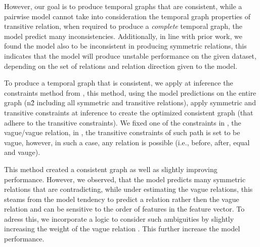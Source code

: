 





However, our goal is to produce temporal graphs that are consistent, while a pairwise model cannot take into consideration the temporal graph properties of transitive relation, when required to produce a \textit{complete} temporal graph, the model predict many inconsistencies. Additionally, in line with prior work, we found the model also to be inconsistent in producing symmetric relations, this indicates that the model will produce unstable performance on the given dataset, depending on the set of relations and relation direction given to the model. 

To produce a temporal graph that is consistent, we apply at inference the constraints method from \citep{ning-etal-2018-joint}, this method, using the model predictions on the entire graph (n\^2 including all symmetric and transitive relations), apply symmetric and transitive constraints at inference to create the optimized consistent graph (that adhere to the transitive constraints). We fixed one of the constraints in \citep{ning-etal-2018-joint}, the vague/vague relation, in \citep{ning-etal-2018-joint}, the transitive constraints of such path is set to be vague, however, in such a case, any relation is possible (i.e., before, after, equal and vauge).

This method created a consistent graph as well as slightly improving performance. However, we observed, that the model predicts many symmetric relations that are contradicting, while under estimating the vague relations, this steams from the model tendency to predict a relation rather then the vague relation and can be sensitive to the order of features in the feature vector. To adress this, we incorporate a logic to consider such ambiguities by slightly increasing the weight of the vague relation . This further increase the model performance.






